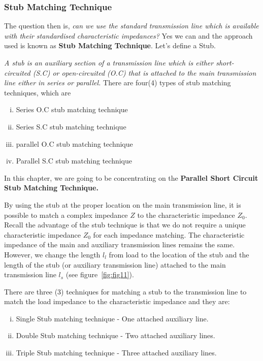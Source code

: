 \subsubsection{Stub Matching Technique}
The question then is, \emph{can we use the standard transmission line which is available with their standardised characteristic impedances?} Yes we can and the approach used is known as \textbf{Stub Matching Technique}. Let's define a Stub.

\emph{A stub is an auxiliary section of a transmission line which is either short-circuited (S.C) or open-circuited (O.C) that is attached to the main transmission line either in series or parallel.} There are four(4) types of stub matching techniques, which are
\begin{enumerate}[(i)]
\item Series O.C stub matching technique
\item Series S.C stub matching technique
\item parallel O.C stub matching technique
\item Parallel S.C stub matching technique
\end{enumerate}
In this chapter, we are going to be concentrating on the \textbf{Parallel Short Circuit Stub Matching Technique.}

By using the stub at the proper location on the main transmission line, it is possible to match a complex impedance $Z$ to the characteristic impedance $Z_0$.
Recall the advantage of the stub technique is that we do not require a unique characteristic impedance $Z_0$ for each impedance matching. The characteristic impedance of the main and auxiliary transmission lines remains the same. However, we change the length $l_l$ from load to the location of the stub and the length of the stub (or auxiliary transmission line) attached to the main transmission line $l_s$ (see figure~\ref{fig:fig11}).

There are three (3) techniques for matching a stub to the transmission line to match the load impedance to the characteristic impedance and they are:
\begin{enumerate}[(i)]
\item Single Stub matching technique - One attached auxiliary line.
\item Double Stub matching technique - Two attached auxiliary lines.
\item Triple Stub matching technique - Three attached auxiliary lines.
\end{enumerate}

